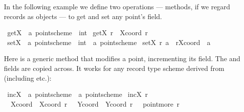 \begin{isabellebody}
\begin{isamarkuptext}
  In the following example we define two operations --- methods, if we
  regard records as objects --- to get and set any point's  field.%
\end{isamarkuptext}%
\isamarkuptrue%
\isamarkupfalse%
\ getX\ {}{}\ {}{}a\ point{}scheme\ {}\ int{}\ \isanewline
{}getX\ r\ {}\ Xcoord\ r{}\isanewline
{}\isamarkupfalse%
\ setX\ {}{}\ {}{}a\ point{}scheme\ {}\ int\ {}\ {}a\ point{}scheme{}\ \isanewline
{}setX\ r\ a\ {}\ r{}Xcoord\ {}{}\ a{}{}%
\begin{isamarkuptext}%
Here is a generic method that modifies a point, incrementing its
   field.  The  and  fields
  are copied across.  It works for any record type scheme derived from
   (including  etc.):%
\end{isamarkuptext}%
\isamarkuptrue%
\isamarkupfalse%
\ incX\ {}{}\ {}{}a\ point{}scheme\ {}\ {}a\ point{}scheme{}\ \isanewline
{}incX\ r\ {}\isanewline
\ \ {}Xcoord\ {}\ Xcoord\ r\ {}\ {}{}\ Ycoord\ {}\ Ycoord\ r{}\ {}\ {}\ point{}more\ r{}{}%

\end{isabellebody}
